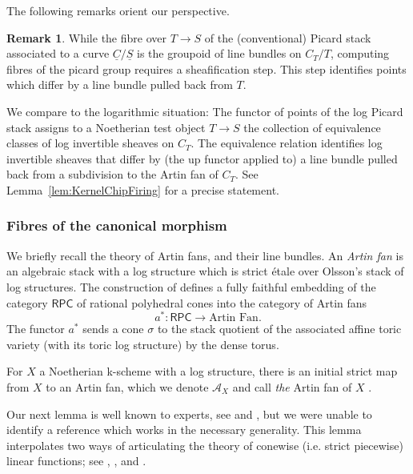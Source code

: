 \documentclass[11pt]{amsart}
\theoremstyle{definition}
\theoremstyle{definition}
\newtheorem{remark}[theorem]{Remark}
\begin{document}
The following remarks orient our perspective.
\begin{remark}\label{rem:OGfunctor}
    While the fibre over $T\rightarrow S$ of the (conventional) Picard stack associated to a curve $\underline{C}/\underline{S}$ is the groupoid of line bundles on $C_T/T$, computing fibres of the picard group requires a sheafification step. This step identifies points which differ by a line bundle pulled back from $T$.   

    We compare to the logarithmic situation: The functor of points of the log Picard stack assigns to a Noetherian test object $T\rightarrow S$ the collection of equivalence classes of log invertible sheaves on $C_T$. The equivalence relation identifies log invertible sheaves that differ by (the up functor applied to) a line bundle pulled back from a subdivision to the Artin fan of $C_T$. See Lemma~\ref{lem:KernelChipFiring} for a precise statement. 
\end{remark}

\subsubsection{Fibres of the canonical morphism} We briefly recall the theory of Artin fans, and their line bundles.
An \emph{Artin fan} is an algebraic stack with a log structure which is strict \'etale over Olsson's stack of log structures.
The construction of \cite{ModStckTropCurve} defines a fully faithful embedding of the category $\mathsf{RPC}$ of rational polyhedral cones into the category of Artin fans $$a^\ast \colon \mathsf{RPC}\longrightarrow \text{Artin Fan}.$$
The functor $a^\ast$ sends a cone $\sigma$ to the stack quotient of the associated affine toric variety (with its toric log structure) by the dense torus.

For $X$ a Noetherian k-scheme with a log structure, there is an initial strict map from $X$ to an Artin fan, which we denote $\mathcal{A}_X$ and call \textit{the} Artin fan of $X$ \cite[Proposition 3.2.1]{abramovich2017boundedness}.

Our next lemma is well known to experts, see \cite[Remark 7.3]{ModStckTropCurve} and \cite[§2.5]{HolmesMolchoPandharipandePixtonSchmitt2025}, but we were unable to identify a reference which works in the necessary generality. This lemma interpolates two ways of articulating the theory of conewise (i.e. strict piecewise) linear functions; see \cite{HolmesSchwarz2022}, \cite{MolchoPandharipandeSchmitt2023}, and \cite{MolchoRanganathan2024}. 
\end{document}

